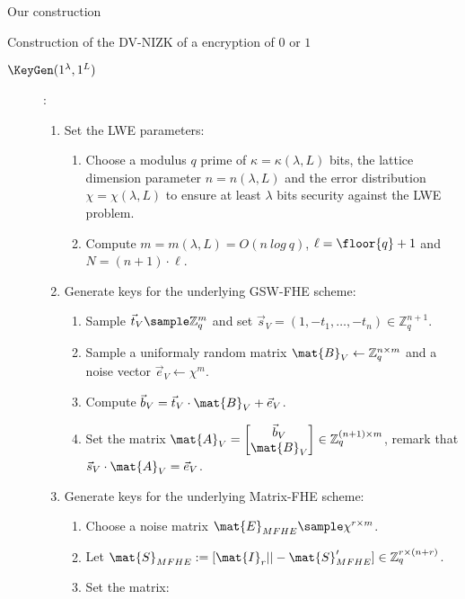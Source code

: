 \begin{section}{Our construction}
  \begin{subsection}{Construction of the DV-NIZK of a encryption of $0$ or $1$}
    
    \begin{description}
    \item[$\KeyGen(1^\lambda, 1^L)$]:
      \begin{enumerate}
      \item Set the LWE parameters:
        \begin{enumerate}
        \item Choose a modulus $q$ prime of $\kappa = \kappa(\lambda, L)$ bits, the lattice dimension parameter $n = n(\lambda, L)$ and the error distribution $\chi = \chi(\lambda, L)$ to ensure at least $\lambda$ bits security against the LWE problem.
        \item Compute $m = m(\lambda, L) = O(n~log~q)$, $\ell = \floor{q}+1$ and $N = (n+1) \cdot \ell$.
        \end{enumerate}
      \item Generate keys for the underlying GSW-FHE scheme:
        \begin{enumerate}
        \item Sample $\vec{t}_V \sample \mathbb{Z}_q^m$ and set $\vec{s}_V = (1, -t_1, \dots, -t_n) \in \mathbb{Z}_q^{n+1}$.
        \item Sample a uniformaly random matrix $\mat{B}_V \gets \mathbb{Z}_q^{n \times m}$ and a noise vector $\vec{e}_V \gets \chi^m$.
        \item Compute $\vec{b}_V = \vec{t}_V \cdot \mat{B}_V  + \vec{e}_V$.
        \item Set the matrix $\mat{A}_V = \begin{bmatrix}\vec{b}_V \\ \mat{B}_V \end{bmatrix} \in \mathbb{Z}_q^{(n+1) \times m}$, remark that $\vec{s}_V \cdot \mat{A}_V = \vec{e}_V$.
        \end{enumerate}
      \item Generate keys for the underlying Matrix-FHE scheme:
        \begin{enumerate}
        \item Choose a noise matrix $\mat{E}_{MFHE} \sample \chi^{r \times m}$.
        \item Let $\mat{S}_{MFHE}:= [\mat{I}_r || - \mat{S}_{MFHE}'] \in \mathbb{Z}_q^{r \times (n+r)}$.
        \item Set the matrix:

\end{enumerate}
\end{enumerate}
\end{description}
\end{subsection}
\end{section}
